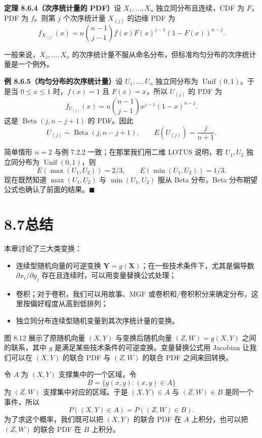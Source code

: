 \documentclass[UTF8, 12pt, fontset=fandol, oneside]{ctexart}
\begin{document}
\noindent\textbf{定理 8.6.4（次序统计量的 PDF）}\quad 设 $X_1,\ldots,X_n$ 独立同分布且连续，CDF 为 $F$，PDF 为 $f$。则第 $j$ 个次序统计量 $X_{(j)}$ 的边缘 PDF 为
\[
  f_{X_{(j)}}(x)
  =
  n{n-1\choose j-1}f(x)F(x)^{j-1}(1-F(x))^{n-j}.
\]

一般来说，$X_1,\ldots,X_n$ 的次序统计量不服从命名分布，但标准均匀分布的次序统计量是一个例外。

\noindent\textbf{例 8.6.5（均匀分布的次序统计量）}\quad 设 $U_1,\ldots,U_n$ 独立同分布为 $\operatorname{Unif}(0,1)$。于是当 $0\le x\le1$ 时，$f(x)=1$ 且 $F(x)=x$，所以 $U_{(j)}$ 的 PDF 为
\[
  f_{U_{(j)}}(x)
  =
  n{n-1\choose j-1}x^{j-1}(1-x)^{n-j}.
\]
这是 $\operatorname{Beta}(j,n-j+1)$ 的 PDF。因此
\[
  U_{(j)}\sim\operatorname{Beta}(j,n-j+1),
  \qquad
  E(U_{(j)})=\frac{j}{n+1}.
\]

简单情形 $n=2$ 与例 7.2.2 一致；在那里我们用二维 LOTUS 说明，若 $U_1,U_2$ 独立同分布为 $\operatorname{Unif}(0,1)$，则
\[
  E(\max(U_1,U_2))=2/3,\qquad
  E(\min(U_1,U_2))=1/3.
\]
现在既然知道 $\max(U_1,U_2)$ 与 $\min(U_1,U_2)$ 服从 Beta 分布，Beta 分布期望公式也确认了前面的结果。$\blacksquare$

\section*{8.7\quad 总结}

本章讨论了三大类变换：
\begin{itemize}
  \item 连续型随机向量的可逆变换 $\mathbf Y=g(\mathbf X)$；在一些技术条件下，尤其是偏导数 $\partial x_i/\partial y_j$ 存在且连续时，可以用变量替换公式处理；
  \item 卷积；对于卷积，我们可以用故事、MGF 或卷积和/卷积积分来确定分布，这里按偏好程度从高到低排列；
  \item 独立同分布连续型随机变量到其次序统计量的变换。
\end{itemize}

图 8.12 展示了原随机向量 $(X,Y)$ 与变换后随机向量 $(Z,W)=g(X,Y)$ 之间的联系，其中 $g$ 是满足某些技术条件的可逆变换。变量替换公式用 Jacobian 让我们可以在 $(X,Y)$ 的联合 PDF 与 $(Z,W)$ 的联合 PDF 之间来回转换。

令 $A$ 为 $(X,Y)$ 支撑集中的一个区域，令
\[
  B=\{g(x,y):(x,y)\in A\}
\]
为 $(Z,W)$ 支撑集中对应的区域。于是 $(X,Y)\in A$ 与 $(Z,W)\in B$ 是同一个事件，所以
\[
  P((X,Y)\in A)=P((Z,W)\in B).
\]
为了求这个概率，我们既可以把 $(X,Y)$ 的联合 PDF 在 $A$ 上积分，也可以把 $(Z,W)$ 的联合 PDF 在 $B$ 上积分。
\end{document}
